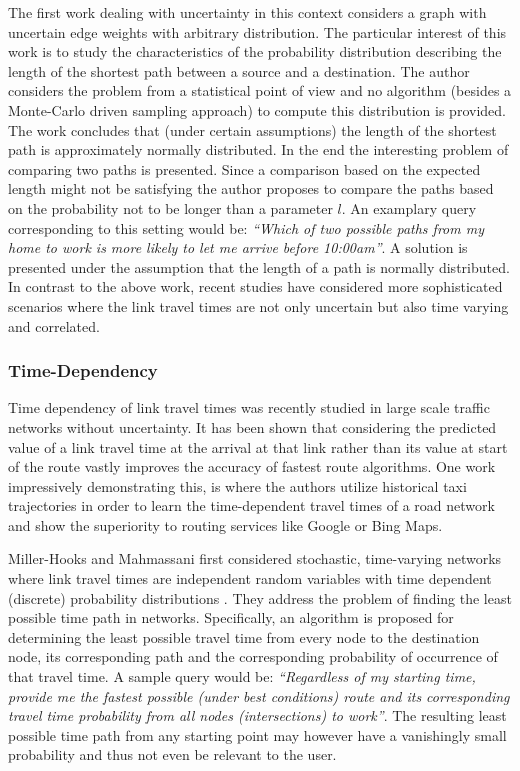 The first work \cite{Fra69}  dealing with uncertainty in this context considers
a graph with uncertain edge weights with arbitrary distribution. The particular
interest of this work is to study the characteristics of the probability
distribution describing the length of the shortest path between a source and a
destination.
The author considers the problem from a statistical point of view and no algorithm (besides
a Monte-Carlo driven sampling approach) to compute this distribution is
provided.
The work concludes that (under certain assumptions) the length of the shortest
path is approximately normally distributed. In the end the interesting problem of
comparing two paths is presented. Since a comparison based on the expected
length might not be satisfying the author proposes to compare the paths based on
the probability not to be longer than a parameter $l$. An examplary query
corresponding to this setting would be: \textit{``Which of two possible paths
from my home to work is more likely to let me arrive before 10:00am''}. A
solution is presented under the assumption that the length of a path is normally
distributed.
In contrast to the above work, recent studies have considered more
sophisticated scenarios where the link travel times are not only uncertain but
also time varying and correlated.

\subsubsection{Time-Dependency}
Time dependency of link travel times was recently studied in
large scale traffic networks \cite{DemiryurekSSD11,PanDS12} without uncertainty.
It has been shown that considering the predicted value of a link travel time at the arrival at
that link rather than its value at start of the route vastly improves the accuracy of fastest route
algorithms. One work impressively demonstrating this, is \cite{YuaZhe10} where
the authors utilize historical taxi trajectories in order to learn the
time-dependent travel times of a road network and show the superiority to
routing services like Google or Bing Maps.

Miller-Hooks and Mahmassani first considered stochastic,
time-varying networks where link travel times are independent random variables
with time dependent (discrete) probability distributions \cite{MilEliMah98}.
They address the problem of finding the least possible time path in networks. Specifically, an
algorithm is proposed for determining the least possible travel time from every node to the destination node, its corresponding path and the corresponding probability of
occurrence of that travel time. A sample query would be: \textit{``Regardless
of my starting time, provide me the fastest possible (under best conditions)
route and its corresponding travel time probability from all nodes (intersections) to
work''}. The resulting least possible time path from any starting point may
however have a vanishingly small probability and thus not even be relevant to
the user.


